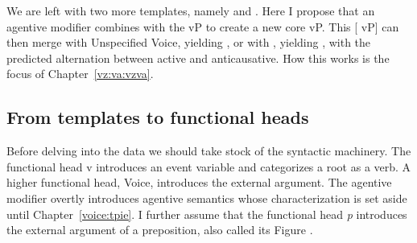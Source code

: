 \begin{exe}
\begin{xlist}
\begin{exe}
\begin{exe}
\begin{exe}
\begin{exe}
\begin{xlist}
\begin{exe}
\begin{xlist}
\begin{xlist}
\begin{xlist}
\begin{exe}
\begin{xlist}
\begin{exe}
\begin{exe}
\begin{exe}
\begin{exe}
\begin{xlist}
\begin{exe}
\begin{xlist}
\begin{exe}
\begin{exe}
\begin{xlist}
\begin{exe}
\begin{xlist}
\begin{exe}
\begin{xlist}
\begin{exe}
\begin{exe}
\begin{xlist}
\begin{exe}
\begin{exe}
\begin{xlist}
\begin{exe}
\begin{exe}
\begin{xlist}
\begin{exe}
\begin{exe}
\begin{xlist}
\begin{exe}
\begin{xlist}
\begin{exe}
\begin{exe}
\begin{exe}
\begin{exe}
\begin{xlist}
\begin{exe}
\begin{xlist}
\begin{exe}
\begin{exe}
\begin{exe}
\begin{exe}
\begin{exe}
\begin{exe}
\begin{xlist}
\begin{exe}
\begin{exe}
We are left with two more templates, namely {\tpie} and {\thit}. Here I propose that an agentive modifier {\va} combines with the vP to create a new core vP. This [{\va} vP] can then merge with Unspecified Voice, yielding {\tpie}, or with {\vz}, yielding {\thit}, with the predicted alternation between active and anticausative. How this works is the focus of Chapter~\ref{vz:va:vzva}.

	\subsection{From templates to functional heads} \label{intro:sketch:heads}
Before delving into the data we should take stock of the syntactic machinery. The functional head v introduces an event variable and categorizes a root as a verb. A higher functional head, Voice, introduces the external argument. The agentive modifier {\va} overtly introduces agentive semantics whose characterization is set aside until Chapter~\ref{voice:tpie}. I further assume that the functional head \emph{p} introduces the external argument of a preposition, also called its Figure \citep{svenonius03,svenonius07,wood14nllt}. 


\end{exe}
\end{exe}
\end{xlist}
\end{exe}
\end{exe}
\end{exe}
\end{exe}
\end{exe}
\end{exe}
\end{xlist}
\end{exe}
\end{xlist}
\end{exe}
\end{exe}
\end{exe}
\end{exe}
\end{xlist}
\end{exe}
\end{xlist}
\end{exe}
\end{exe}
\end{xlist}
\end{exe}
\end{exe}
\end{xlist}
\end{exe}
\end{exe}
\end{xlist}
\end{exe}
\end{exe}
\end{xlist}
\end{exe}
\end{xlist}
\end{exe}
\end{xlist}
\end{exe}
\end{exe}
\end{xlist}
\end{exe}
\end{xlist}
\end{exe}
\end{exe}
\end{exe}
\end{exe}
\end{xlist}
\end{exe}
\end{xlist}
\end{xlist}
\end{xlist}
\end{exe}
\end{xlist}
\end{exe}
\end{exe}
\end{exe}
\end{exe}
\end{xlist}
\end{exe}
